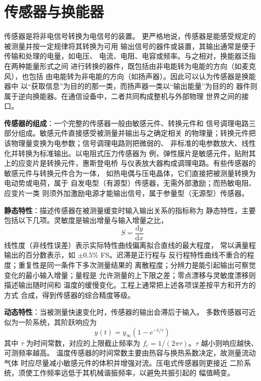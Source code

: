 
\section{传感器与换能器}
\label{sec:sensors_transducers}

传感器是将非电信号转换为电信号的装置。
更严格地说，传感器是能感受规定的被测量并按一定规律将其转换为可用
输出信号的器件或装置，其输出通常是便于传输和处理的电量，如电压、
电流、电阻、电容或频率。与之相对，换能器泛指在两种能量形式之间
进行转换的器件，既包括由非电能转为电能的方向（如麦克风），也包括
由电能转为非电能的方向（如扬声器）。因此可以认为传感器是换能器中
以“获取信息”为目的的那一类，而扬声器一类以“输出能量”为目的的
器件则属于逆向换能器。在通信设备中，二者共同构成整机与外部物理
世界之间的接口。

\textbf{传感器的组成}：一个完整的传感器一般由敏感元件、转换元件和
信号调理电路三部分组成。敏感元件直接感受被测量并输出与之确定相关
的物理量；转换元件把该物理量变换为电参数；信号调理电路则把微弱的、
非标准的电参数放大、线性化并转换为标准输出。以电阻式压力传感器为
例，弹性膜片是敏感元件，贴附其上的应变片是转换元件，惠斯登电桥
与仪表放大器构成调理电路。有些传感器的敏感元件与转换元件合为一体，
如热电偶与压电晶体，它们直接把被测量转换为电动势或电荷，属于
自发电型（有源型）传感器，无需外部激励；而热敏电阻、应变片一类
则须外加激励电源才能输出信号，属于参量型（无源型）传感器。

\textbf{静态特性}：描述传感器在被测量缓变时输入输出关系的指标称为
静态特性，主要包括以下几项。灵敏度是输出增量与输入增量之比，
\[
S = \frac{\mathrm{d}y}{\mathrm{d}x}
\]
线性度（非线性误差）表示实际特性曲线偏离拟合直线的最大程度，
常以满量程输出的百分数表示，如 $\pm0.5\%$ FS。迟滞是正行程与
反行程特性曲线不重合的程度；重复性是同一条件下多次测量结果的
离散程度；分辨力是能引起输出可察觉变化的最小输入增量；量程是
允许测量的上下限之差；零点漂移与灵敏度漂移则描述输出随时间和
温度的缓慢变化。工程上通常把上述各项误差按平方和开方的方式
合成，得到传感器的综合精度等级。

\textbf{动态特性}：当被测量快速变化时，传感器的输出会滞后于输入。
多数传感器可近似为一阶系统，其阶跃响应为
\begin{equation}
y(t) = y_\infty \left(1 - e^{-t/\tau}\right)
\end{equation}
其中 $\tau$ 为时间常数，对应的上限截止频率为
$f_c = 1/(2\pi\tau)$。$\tau$ 越小则响应越快、可测频率越高。
温度传感器的时间常数主要由热容与换热系数决定，故测量流动气体
时应尽量减小敏感元件的体积并增强对流。压电式传感器则更接近
二阶系统，须使工作频率远低于其机械谐振频率，以避免共振引起的
幅值畸变。

